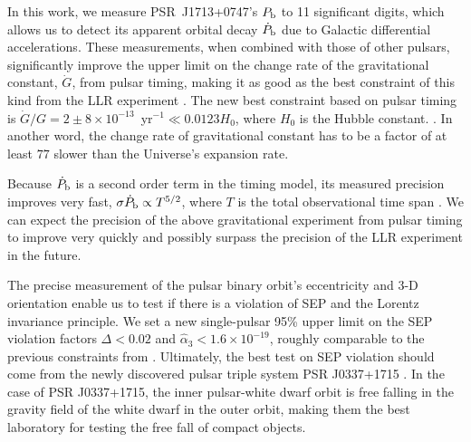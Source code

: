 In this work, we measure PSR~J1713+0747's $P_{\rm b}$ to 11 significant
digits, which allows us to detect its apparent orbital decay $\dot{P}_{\rm b}$ due to Galactic differential accelerations.
These measurements, when combined with those of other pulsars, 
significantly improve the upper limit on the change rate of the gravitational
 constant, $\dot{G}$, from pulsar timing, making it as good as the best
constraint of this kind from the LLR experiment \citep{hmb10}.
The new best constraint based on pulsar timing is $\dot{G}/G
=2\pm8\times10^{-13}$~yr$^{-1}\ll0.0123H_0$, where $H_0$ is the Hubble constant. . 
In another word, the change rate of gravitational constant has to be a factor
of at least $77$ slower than the Universe's expansion rate.

Because $\dot P_{\rm b}$ is a second order term in the timing 
model, its measured precision improves very fast, $\sigma \dot
P_{\rm b} \propto T^{5/2}$, where $T$ is the total observational time
span \cite{dt92}.
We can expect the precision of the above gravitational experiment from pulsar
timing to improve very quickly and possibly surpass the precision
of the LLR
experiment in the future.

The precise measurement of the pulsar binary orbit's eccentricity and
3-D orientation enable us to test if there is a violation of SEP and the
Lorentz invariance principle. We set a new single-pulsar 95\% upper limit on the SEP violation
factors $\Delta <0.02$ and $\hat{\alpha}_3<1.6\times10^{-19}$, roughly comparable
to the previous constraints from \citealt{wex00, sns+05, sfl+05, gsf+11}.
Ultimately, the best test on SEP violation should come from the newly
discovered pulsar triple system PSR J0337+1715 \citep{rsa+14}. In the case of
PSR J0337+1715, the
inner pulsar-white dwarf orbit is free falling in the gravity field of the
white dwarf in the outer orbit, making them the best laboratory for testing
the free fall of compact objects.



